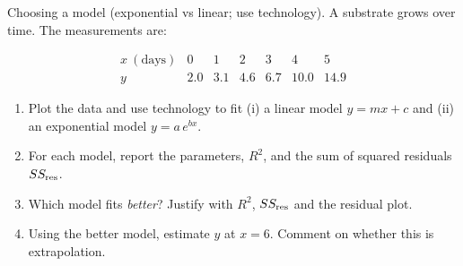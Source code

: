 \documentclass[11pt]{article}
\def\textbf#1{#1}%
\newcounter{question}
\begin{document}

\begin{question}
\textbf{Choosing a model (exponential vs linear; use technology).}
A substrate grows over time. The measurements are:

\[
\begin{array}{c|cccccc}
x\ (\text{days}) & 0 & 1 & 2 & 3 & 4 & 5\\\hline
y & 2.0 & 3.1 & 4.6 & 6.7 & 10.0 & 14.9
\end{array}
\]

\begin{enumerate}
  \item Plot the data and use technology to fit (i) a linear model $y=mx+c$ and (ii) an exponential model $y=a\,e^{bx}$.
  \item For each model, report the parameters, $R^2$, and the sum of squared residuals $SS_{\rm res}$.
  \item Which model fits \emph{better}? Justify with $R^2$, $SS_{\rm res}$ and the residual plot.
  \item Using the better model, estimate $y$ at $x=6$. Comment on whether this is extrapolation.
\end{enumerate}

\begin{center}
\end{center}
\end{question}
\end{document}
